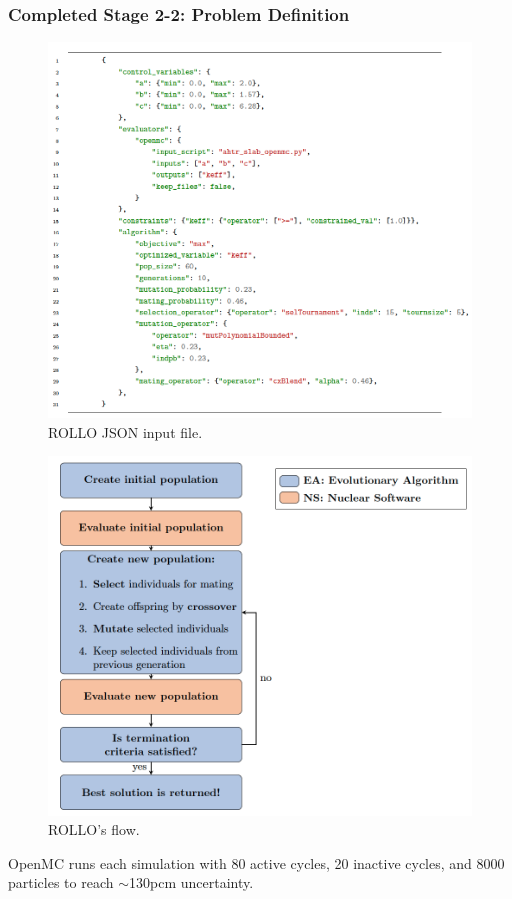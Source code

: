 \begin{frame}
    \frametitle{Completed Stage 2-2: Problem Definition}
    \begin{minipage}[c]{0.6\textwidth}
    \begin{figure}
        \includegraphics[width=0.9\linewidth]{figures/ii2-rollo-input.png}
        \caption{ROLLO JSON input file.}
    \end{figure}
\end{minipage}\hfill
    \begin{minipage}[c]{0.4\textwidth}
        \centering
        \begin{figure}
            \includegraphics[width=\linewidth]{figures/rollo-flow.png} 
            \caption{ROLLO's flow.}
        \end{figure}
    \end{minipage}
    \scriptsize
    OpenMC runs each simulation with 80 active cycles, 20 inactive cycles, and 
    8000 particles to reach $\sim$130pcm uncertainty.
\end{frame}

